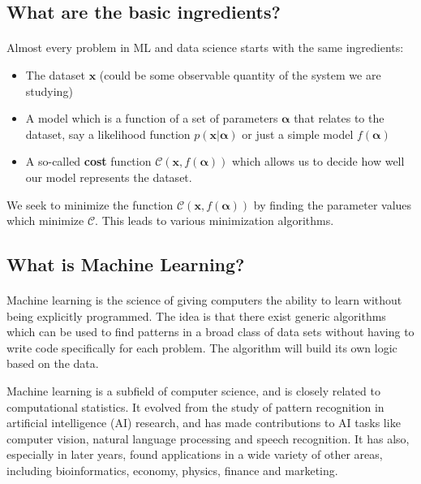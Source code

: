 \documentclass[%
oneside,                 %
final,                   %
10pt]{article}
\begin{document}
\subsection{What are the basic ingredients?}

\paragraph{}
Almost every problem in ML and data science starts with the same ingredients:
\begin{itemize}
\item The dataset $\mathbf{x}$ (could be some observable quantity of the system we are studying)

\item A model which is a function of a set of parameters $\mathbf{\alpha}$ that relates to the dataset, say a likelihood  function $p(\mathbf{x}\vert \mathbf{\alpha})$ or just a simple model $f(\mathbf{\alpha})$

\item A so-called \textbf{cost} function $\mathcal{C} (\mathbf{x}, f(\mathbf{\alpha}))$ which allows us to decide how well our model represents the dataset. 
\end{itemize}

\noindent
We seek to minimize the function $\mathcal{C} (\mathbf{x}, f(\mathbf{\alpha}))$ by finding the parameter values which minimize $\mathcal{C}$. This leads to  various minimization algorithms.



\subsection{What is Machine Learning?}

\paragraph{}
Machine learning is the science of giving computers the ability to
learn without being explicitly programmed.  The idea is that there
exist generic algorithms which can be used to find patterns in a broad
class of data sets without having to write code specifically for each
problem. The algorithm will build its own logic based on the data.

Machine learning is a subfield of computer science, and is closely
related to computational statistics.  It evolved from the study of
pattern recognition in artificial intelligence (AI) research, and has
made contributions to AI tasks like computer vision, natural language
processing and speech recognition. It has also, especially in later
years, found applications in a wide variety of other areas, including
bioinformatics, economy, physics, finance and marketing.
\end{document}
